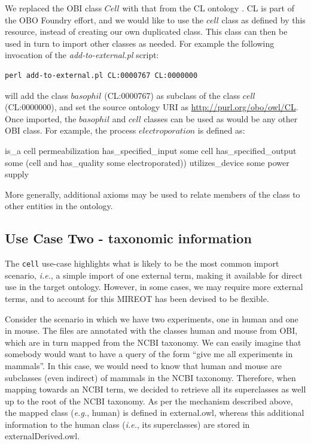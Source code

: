 \documentclass{ao2e}%
\begin{document}
We replaced the \ac{OBI} class $Cell$ with that from the \ac{CL} ontology \cite{CL}. 
\ac{CL} is part of the \ac{OBO} Foundry effort, and we would like to use the $cell$ class as defined by this resource, instead of creating our own duplicated class.
This class can then be used in turn to import other classes as needed.
For example the following invocation of the \emph{add-to-external.pl} script:

\begin{footnotesize}
\begin{verbatim}
perl add-to-external.pl CL:0000767 CL:0000000 
\end{verbatim}
\end{footnotesize}

will add the class $basophil$ (CL:0000767) as subclass of the class $cell$  (CL:0000000), and set the source ontology URI as \url{http://purl.org/obo/owl/CL}.
Once imported, the $basophil$ and $cell$ classes can be used as would be any other OBI class. For example, the process $electroporation$ is defined as:

\begin{footnotesize}
\begin{verbatimtab}
is_a cell permeabilization
has_specified_input some cell
has_specified_output some 
   (cell and has_quality some electroporated))
utilizes_device some power supply
\end{verbatimtab}
\end{footnotesize}

More generally, additional axioms may be used to relate members of the class to other entities in the ontology.


\subsection*{Use Case Two - taxonomic information}

The \texttt{cell} use-case highlights what is likely to be the most common import scenario, \emph{i.e.}, a simple import of one external term, making it available for direct use in the target ontology.
However, in some cases, we may require more external terms, and to account for this \ac{MIREOT} has been devised to be flexible.

Consider the scenario in which we have two experiments, one in human and one in mouse. 
The files are annotated with the classes human and mouse from OBI, which are in turn 
mapped from the NCBI taxonomy. 
We can easily imagine that somebody would want to have a query of the form ``give me all 
experiments in mammals''. In this case, we would need to know that human and mouse are 
subclasses (even indirect) of mammals in the NCBI taxonomy. Therefore, when mapping 
towards an NCBI term, we decided to retrieve all its superclasses as well up to the root of the 
NCBI taxonomy. As per the mechanism described above, the mapped class (\emph{e.g.}, human) is 
defined in external.owl, whereas this additional information to the human class (\emph{i.e.}, its 
superclasses) are stored in externalDerived.owl. 
\end{document}
